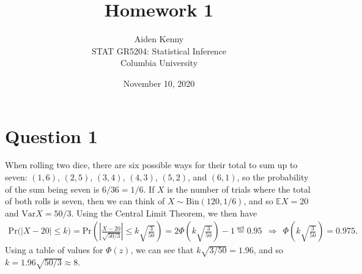 \documentclass[10pt]{article}
\title{
    {\Large Homework 1}
}
\author{
    {\normalsize Aiden Kenny}\\
    {\normalsize STAT GR5204: Statistical Inference}\\
    {\normalsize Columbia University}
}
\date{\normalsize November 10, 2020}
\begin{document}
\maketitle

\section{Question 1} \noindent
When rolling two dice, there are six possible ways for their total to sum up to seven: \((1,6)\), \((2,5)\), \((3,4)\), \((4,3)\), \((5,2)\), and \((6,1)\), 
so the probability of the sum being seven is \(6 / 36 = 1 / 6\). If \(X\) is the number of trials where the total of both rolls is seven, then we can think 
of \(X \sim \mathrm{Bin}(120, 1/6)\), and so \(\mathbb{E}X = 20\) and \(\mathrm{Var}X = 50 / 3\). 
Using the Central Limit Theorem, we then have 
\begin{align*}
    \mathrm{Pr}\big( |X - 20| \le k \big)
    = \mathrm{Pr} \left( \left| \frac{X - 20}{\sqrt{50/3}} \right| \le k \sqrt{\frac{3}{50}} \right)
    = 2 \Phi \left( k \sqrt{\frac{3}{50}} \right) - 1
    \overset{\text{set}}{=} 0.95
    ~~\Longrightarrow~~ \Phi \left( k \sqrt{\frac{3}{50}} \right) = 0.975.
\end{align*}
Using a table of values for \(\Phi(z)\), we can see that \(k \sqrt{3 / 50} = 1.96\), and so \(k = 1.96 \sqrt{50/3} \approx 8\).
\end{document}
